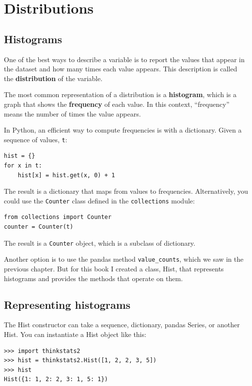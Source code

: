 \documentclass[12pt]{book}
\begin{document}
\chapter{Distributions}
\label{descriptive}


\section{Histograms}
\label{histograms}

One of the best ways to describe a variable is to report the values
that appear in the dataset and how many times each value appears.
This description is called the {\bf distribution} of the variable.

The most common representation of a distribution is a {\bf histogram},
which is a graph that shows the {\bf frequency} of each value.  In
this context, ``frequency'' means the number of times the value
appears.   

In Python, an efficient way to compute frequencies is with a
dictionary.  Given a sequence of values, \verb"t":
%
\begin{verbatim}
hist = {}
for x in t:
    hist[x] = hist.get(x, 0) + 1
\end{verbatim}

The result is a dictionary that maps from values to frequencies.
Alternatively, you could use the \verb"Counter" class defined in the
\verb"collections" module:

\begin{verbatim}
from collections import Counter
counter = Counter(t)
\end{verbatim}

The result is a \verb"Counter" object, which is a subclass of
dictionary.

Another option is to use the pandas method \verb"value_counts", which
we saw in the previous chapter.  But for this book I created a class,
Hist, that represents histograms and provides the methods
that operate on them.


\section{Representing histograms}

The Hist constructor can take a sequence, dictionary, pandas
Series, or another Hist.  You can instantiate a Hist object like this:
%
\begin{verbatim}
>>> import thinkstats2
>>> hist = thinkstats2.Hist([1, 2, 2, 3, 5])
>>> hist
Hist({1: 1, 2: 2, 3: 1, 5: 1})
\end{verbatim}
\end{document}
